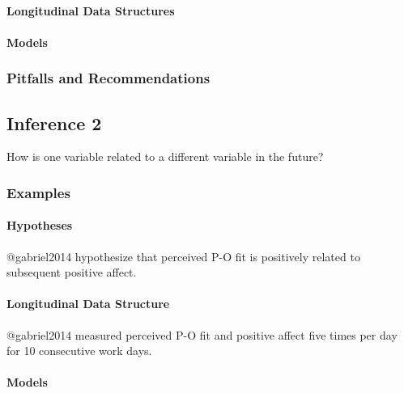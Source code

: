 \documentclass[]{article}
\let\oldparagraph\paragraph
\renewcommand{\paragraph}[1]{\oldparagraph{#1}\mbox{}}
\begin{document}
\hypertarget{longitudinal-data-structures-2}{%
\paragraph{Longitudinal Data
Structures}\label{longitudinal-data-structures-2}}

\hypertarget{models-7}{%
\paragraph{Models}\label{models-7}}

\hypertarget{pitfalls-and-recommendations-7}{%
\subsubsection{Pitfalls and
Recommendations}\label{pitfalls-and-recommendations-7}}

\hypertarget{inference-2-1}{%
\subsection{Inference 2}\label{inference-2-1}}

How is one variable related to a different variable in the future?

\hypertarget{examples-8}{%
\subsubsection{Examples}\label{examples-8}}

\hypertarget{hypotheses-8}{%
\paragraph{Hypotheses}\label{hypotheses-8}}

@gabriel2014 hypothesize that perceived P-O fit is positively related to
subsequent positive affect.

\hypertarget{longitudinal-data-structure-5}{%
\paragraph{Longitudinal Data
Structure}\label{longitudinal-data-structure-5}}

@gabriel2014 measured perceived P-O fit and positive affect five times
per day for 10 consecutive work days.

\hypertarget{models-8}{%
\paragraph{Models}\label{models-8}}
\end{document}
